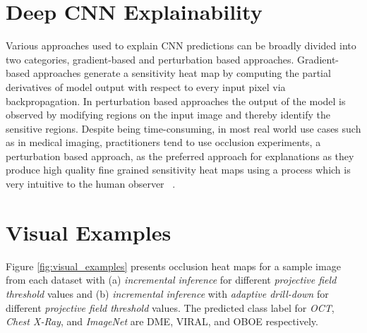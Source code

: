 \section{Deep CNN Explainability}
Various approaches used to explain CNN predictions can be broadly divided into two categories, gradient-based and perturbation based approaches. Gradient-based approaches generate a sensitivity heat map by computing the partial derivatives of model output with respect to every input pixel via backpropagation.
In perturbation based approaches the output of the model is observed by modifying regions on the input image and thereby identify the sensitive regions.
Despite being time-consuming, in most real world use cases such as in medical imaging, practitioners tend to use occlusion experiments, a perturbation based approach, as the preferred approach for explanations as they produce high quality fine grained sensitivity heat maps using a process which is very intuitive to the human observer ~\cite{zeiler2014visualizing,jung2017deep,miller2017explanation}.


\section{Visual Examples}

Figure \ref{fig:visual_examples} presents occlusion heat maps for a sample image from each dataset with (a) \textit{incremental inference} for different \textit{projective field threshold} values and (b) \textit{incremental inference} with \textit{adaptive drill-down} for different \textit{projective field threshold} values. The predicted class label for \textit{OCT}, \textit{Chest X-Ray}, and \textit{ImageNet} are DME, VIRAL, and OBOE respectively.

